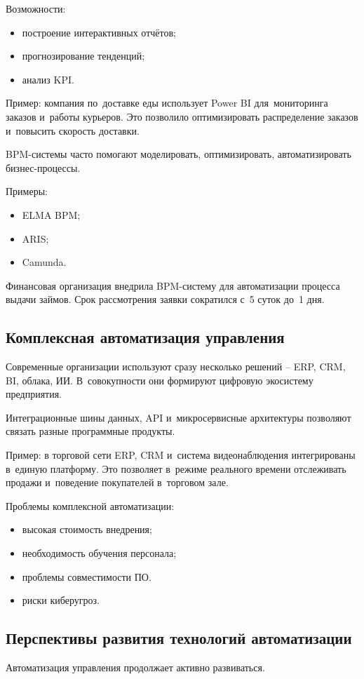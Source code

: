 \documentclass{ou}
\begin{document}
Возможности:
\begin{itemize}[label=-, leftmargin=0em, itemindent=3.35em, nosep]
\item построение интерактивных отчётов;
\item прогнозирование тенденций;
\item анализ KPI.
\end{itemize}

Пример: компания по~доставке еды использует Power BI для~мониторинга заказов и~работы курьеров. Это позволило оптимизировать распределение заказов и~повысить скорость доставки.

BPM-системы часто помогают моделировать, оптимизировать, автоматизировать бизнес-процессы.

Примеры:
\begin{itemize}[label=-, leftmargin=0em, itemindent=3.35em, nosep]
\item ELMA BPM;
\item ARIS;
\item Camunda.
\end{itemize}

Финансовая организация внедрила BPM-систему для автоматизации процесса выдачи займов. Срок рассмотрения заявки сократился с~5 суток до~1 дня.
\subsection{Комплексная автоматизация управления}
Современные организации используют сразу несколько решений -- ERP, CRM, BI, облака, ИИ. В~совокупности они формируют цифровую экосистему предприятия.

Интеграционные шины данных, API и~микросервисные архитектуры позволяют связать разные программные продукты.

Пример: в торговой сети ERP, CRM и~система видеонаблюдения интегрированы в~единую платформу. Это позволяет в~режиме реального времени отслеживать продажи и~поведение покупателей в~торговом зале.

Проблемы комплексной автоматизации:
\begin{itemize}[label=-, leftmargin=0em, itemindent=3.35em, nosep]
\item высокая стоимость внедрения;
\item необходимость обучения персонала;
\item проблемы совместимости ПО.
\item риски киберугроз.
\end{itemize}
\subsection{Перспективы развития технологий автоматизации}
Автоматизация управления продолжает активно развиваться.
\end{document}

